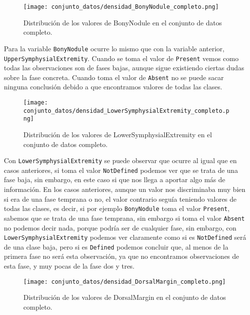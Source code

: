 \begin{figure}[H]
	\centering
	\texttt{[image: conjunto\_datos/densidad\_BonyNodule\_completo.png]}
	\caption{Distribución de los valores de BonyNodule en el conjunto de datos completo.}
	\label{fig:densidad_BonyNodule_completo}
\end{figure}

Para la variable \texttt{BonyNodule} ocurre lo mismo que con la variable anterior, \texttt{UpperSymphysialExtremity}. Cuando se toma el valor de \texttt{Present} vemos como todas las observaciones son de fases bajas, aunque sigue existiendo ciertas dudas sobre la fase concreta. Cuando toma el valor de \texttt{Absent} no se puede sacar ninguna conclusión debido a que encontramos valores de todas las clases.



\begin{figure}[H]
	\centering
	\texttt{[image: conjunto\_datos/densidad\_LowerSymphysialExtremity\_completo.png]}
	\caption{Distribución de los valores de LowerSymphysialExtremity en el conjunto de datos completo.}
	\label{fig:densidad_LowerSymphysialExtremity_completo}
\end{figure}

Con \texttt{LowerSymphysialExtremity} se puede observar que ocurre al igual que en casos anteriores, si toma el valor \texttt{NotDefined} podemos ver que se trata de una fase baja, sin embargo, en este caso si que nos llega a aportar algo más de información. En los casos anteriores, aunque un valor nos discriminaba muy bien si era de una fase temprana o no, el valor contrario seguía teniendo valores de todas las clases, es decir, si por ejemplo \texttt{BonyNodule} toma el valor \texttt{Present}, sabemos que se trata de una fase temprana, sin embargo si toma el valor \texttt{Absent} no podemos decir nada, porque podría ser de cualquier fase, sin embargo, con \texttt{LowerSymphysialExtremity} podemos ver claramente como si es \texttt{NotDefined} será de una clase baja, pero si es \texttt{Defined} podemos concluir que, al menos de la primera fase no será esta observación, ya que no encontramos observaciones de esta fase, y muy pocas de la fase dos y tres.

\begin{figure}[H]
	\centering
	\texttt{[image: conjunto\_datos/densidad\_DorsalMargin\_completo.png]}
	\caption{Distribución de los valores de DorsalMargin en el conjunto de datos completo.}
	\label{fig:densidad_DorsalMargin_completo}
\end{figure}


